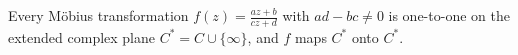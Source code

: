 Every Möbius transformation $f(z) = \frac{az+b}{cz+d}$ with $ad-bc \neq 0$ is one-to-one on the extended complex plane $C^* = C \cup \{\infty\}$, and $f$ maps $C^*$ onto $C^*$.
